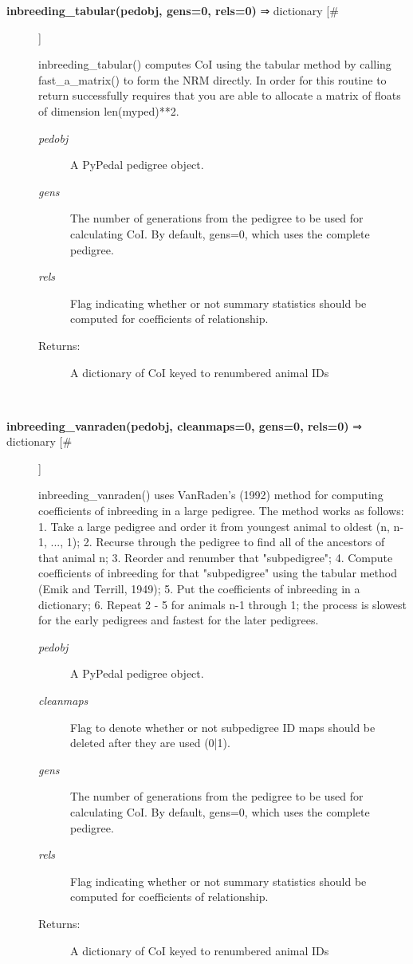 \documentclass{article}
\begin{document}
\begin{description}
\item[\textbf{inbreeding\_tabular(pedobj, gens=0, rels=0)} ⇒ dictionary [\#]
]
\par inbreeding\_tabular() computes CoI using the tabular method by calling
fast\_a\_matrix() to form the NRM directly.  In order for this routine
to return successfully requires that you are able to allocate a matrix
of floats of dimension len(myped)**2.
\begin{description}
\item[\textit{pedobj}
]
A PyPedal pedigree object.
\item[\textit{gens}
]
The number of generations from the pedigree to be used for calculating CoI.  By default, gens=0, which uses the complete pedigree.
\item[\textit{rels}
]
Flag indicating whether or not summary statistics should be computed for coefficients of relationship.
\item[Returns:
]
A dictionary of CoI keyed to renumbered animal IDs
\end{description}\\

\item[\textbf{inbreeding\_vanraden(pedobj, cleanmaps=0, gens=0, rels=0)} ⇒ dictionary [\#]
]
\par inbreeding\_vanraden() uses VanRaden's (1992) method for computing coefficients of
inbreeding in a large pedigree.  The method works as follows:
  1.  Take a large pedigree and order it from youngest animal to oldest (n, n-1, ..., 1);
  2.  Recurse through the pedigree to find all of the ancestors of that animal n;
  3.  Reorder and renumber that "subpedigree";
  4.  Compute coefficients of inbreeding for that "subpedigree" using the tabular
      method (Emik and Terrill, 1949);
  5.  Put the coefficients of inbreeding in a dictionary;
  6.  Repeat 2 - 5 for animals n-1 through 1; the process is slowest for the early
      pedigrees and fastest for the later pedigrees.
\begin{description}
\item[\textit{pedobj}
]
A PyPedal pedigree object.
\item[\textit{cleanmaps}
]
Flag to denote whether or not subpedigree ID maps should be deleted after they are used (0|1).
\item[\textit{gens}
]
The number of generations from the pedigree to be used for calculating CoI.  By default, gens=0, which uses the complete pedigree.
\item[\textit{rels}
]
Flag indicating whether or not summary statistics should be computed for coefficients of relationship.
\item[Returns:
]
A dictionary of CoI keyed to renumbered animal IDs
\end{description}\\


\end{description}
\end{document}
